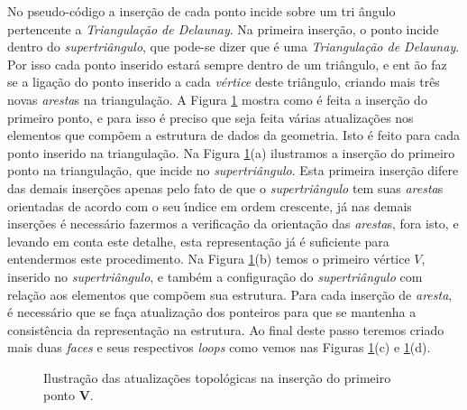 \documentclass[12pt,a4paper]{book}
\begin{document}
No pseudo-c\'{o}digo a inser\c{c}\~{a}o de cada ponto incide sobre um tri%
\^{a}ngulo pertencente a \textit{Triangula\c{c}\~{a}o de Delaunay}. Na primeira 
inser\c{c}\~{a}o, o ponto incide dentro do \textit{supertri\^{a}ngulo},
que pode-se dizer que \'{e} uma \textit{Triangula\c{c}\~{a}o de Delaunay}. Por
isso cada ponto inserido estar\'{a} sempre dentro de um tri\^{a}ngulo, e ent%
\~{a}o faz se a liga\c{c}\~{a}o do ponto inserido a cada \textit{v\'{e}rtice}
deste tri\^{a}ngulo, criando mais tr\^{e}s novas \textit{aresta}s na
triangula\c{c}\~{a}o. A Figura \ref{fig6_chapter6} mostra como \'e feita a inser\c{c}\~{a}o
do primeiro ponto, e para isso \'e preciso que seja feita v\'arias atualiza\c{c}\~{o}es 
nos elementos que comp\~{o}em a estrutura de dados da geometria. Isto \'{e} feito para cada 
ponto inserido na triangula\c{c}\~{a}o. Na Figura \ref{fig6_chapter6}(a) ilustramos a
inser\c{c}\~{a}o do primeiro ponto na triangula\c{c}\~{a}o, que incide no 
\textit{supertri\^{a}ngulo}. Esta primeira inser\c{c}\~{a}o difere das
demais inser\c{c}\~{o}es apenas pelo fato de que o \textit{supertri\^{a}ngulo} 
tem suas \textit{aresta}s orientadas de acordo com o seu \'{\i}ndice em
ordem crescente, j\'{a} nas demais inser\c{c}\~{o}es \'{e} necess\'{a}rio
fazermos a verifica\c{c}\~{a}o da orienta\c{c}\~{a}o das \textit{aresta}s,
fora isto, e levando em conta este detalhe, esta representa\c{c}\~{a}o j\'{a} 
\'{e} suficiente para entendermos este procedimento. Na Figura \ref{fig6_chapter6}(b)
temos o primeiro v\'ertice $V$, inserido no \textit{supertri\^{a}ngulo}, 
e tamb\'{e}m a configura\c{c}\~{a}o do \textit{supertri\^{a}ngulo}
com rela\c{c}\~{a}o aos elementos que comp\~{o}em sua estrutura. Para cada
inser\c{c}\~{a}o de \textit{aresta}, \'e necess\'ario que se fa\c{c}a atualiza\c{c}\~{a}o dos ponteiros para que se mantenha a consist\^encia da representa\c{c}\~{a}o na estrutura. Ao final deste passo teremos criado mais duas \textit{faces} e seus respectivos 
\textit{loops} como vemos nas Figuras \ref{fig6_chapter6}(c) e \ref{fig6_chapter6}(d).

\begin{figure}[htbp]
  \begin{center}
    \leavevmode
    
    \caption{Ilustra\c{c}\~{a}o das atualiza\c{c}\~{o}es topol\'{o}gicas na 
	             inser\c{c}\~{a}o do primeiro ponto \textbf{V}.}
    \label{fig6_chapter6}
  \end{center}
\end{figure}
\end{document}
